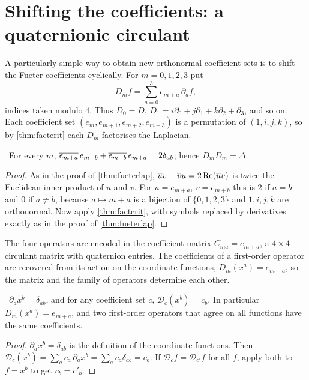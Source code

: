 \section{Shifting the coefficients: a quaternionic circulant}

A particularly simple way to obtain new orthonormal coefficient sets is to shift the Fueter coefficients cyclically. For $m=0,1,2,3$ put
\begin{equation}\label{eq:Dm}
D_mf=\sum_{a=0}^3e_{m+a}\,\partial_af,
\end{equation}
indices taken modulo $4$. Thus $D_0=D$, $D_1=i\partial_0+j\partial_1+k\partial_2+\partial_3$, and so on. Each coefficient set $(e_m,e_{m+1},e_{m+2},e_{m+3})$ is a permutation of $(1,i,j,k)$, so by \cref{thm:factcrit} each $D_m$ factorises the Laplacian.

\begin{proposition}\label{prop:shiftfact}\ver\
For every $m$, $\overline{e_{m+a}}\,e_{m+b}+\overline{e_{m+b}}\,e_{m+a}=2\delta_{ab}$; hence $\bar D_mD_m=\Delta$.
\end{proposition}
\begin{proof}
As in the proof of \cref{thm:fueterlap}, $\overline{u}v+\overline{v}u=2\operatorname{Re}(\overline{u}v)$ is twice the Euclidean inner product of $u$ and $v$. For $u=e_{m+a}$, $v=e_{m+b}$ this is $2$ if $a=b$ and $0$ if $a\ne b$, because $a\mapsto m+a$ is a bijection of $\{0,1,2,3\}$ and $1,i,j,k$ are orthonormal. Now apply \cref{thm:factcrit}, with symbols replaced by derivatives exactly as in the proof of \cref{thm:fueterlap}.
\end{proof}


The four operators are encoded in the coefficient matrix $C_{ma}=e_{m+a}$, a $4\times4$ circulant matrix with quaternion entries. The coefficients of a first-order operator are recovered from its action on the coordinate functions, $D_m(x^a)=e_{m+a}$, so the matrix and the family of operators determine each other.

\begin{proposition}[Coefficients from the operators]\label{prop:coeffextract}\ver\
$\partial_a x^b=\delta_{ab}$, and for any coefficient set $c$, $\mathcal D_c(x^b)=c_b$. In particular $D_m(x^a)=e_{m+a}$, and two first-order operators that agree on all functions have the same coefficients.
\end{proposition}
\begin{proof}
$\partial_ax^b=\delta_{ab}$ is the definition of the coordinate functions. Then $\mathcal D_c(x^b)=\sum_ac_a\,\partial_ax^b=\sum_ac_a\delta_{ab}=c_b$. If $\mathcal D_c f=\mathcal D_{c'}f$ for all $f$, apply both to $f=x^b$ to get $c_b=c'_b$.
\end{proof}


